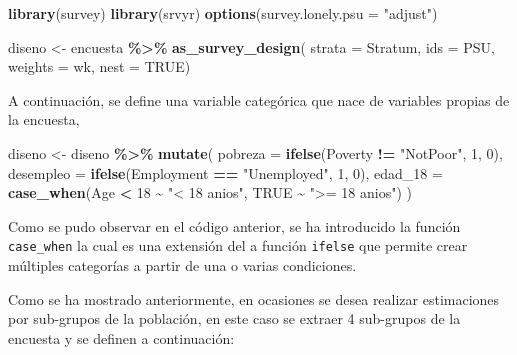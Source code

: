 \documentclass[
  12pt,
]{book}
\newenvironment{Shaded}{\begin{snugshade}}{\end{snugshade}}
\newcommand{\AttributeTok}[1]{\textcolor[rgb]{0.13,0.29,0.53}{#1}}
\newcommand{\ConstantTok}[1]{\textcolor[rgb]{0.56,0.35,0.01}{#1}}
\newcommand{\DecValTok}[1]{\textcolor[rgb]{0.00,0.00,0.81}{#1}}
\newcommand{\FunctionTok}[1]{\textcolor[rgb]{0.13,0.29,0.53}{\textbf{#1}}}
\newcommand{\NormalTok}[1]{#1}
\newcommand{\OtherTok}[1]{\textcolor[rgb]{0.56,0.35,0.01}{#1}}
\newcommand{\SpecialCharTok}[1]{\textcolor[rgb]{0.81,0.36,0.00}{\textbf{#1}}}
\newcommand{\StringTok}[1]{\textcolor[rgb]{0.31,0.60,0.02}{#1}}
\begin{document}
\begin{Shaded}
\begin{Highlighting}[]
\FunctionTok{library}\NormalTok{(survey)}
\FunctionTok{library}\NormalTok{(srvyr)}
\FunctionTok{options}\NormalTok{(}\AttributeTok{survey.lonely.psu =} \StringTok{"adjust"}\NormalTok{)}

\NormalTok{diseno }\OtherTok{\textless{}{-}}\NormalTok{ encuesta }\SpecialCharTok{\%\textgreater{}\%} 
          \FunctionTok{as\_survey\_design}\NormalTok{(}
                           \AttributeTok{strata =}\NormalTok{ Stratum,  }
                           \AttributeTok{ids =}\NormalTok{ PSU,         }
                           \AttributeTok{weights =}\NormalTok{ wk,      }
                           \AttributeTok{nest =} \ConstantTok{TRUE}\NormalTok{)}
\end{Highlighting}
\end{Shaded}

A continuación, se define una variable categórica que nace de variables propias de la encuesta,

\begin{Shaded}
\begin{Highlighting}[]
\NormalTok{diseno }\OtherTok{\textless{}{-}}\NormalTok{ diseno }\SpecialCharTok{\%\textgreater{}\%} \FunctionTok{mutate}\NormalTok{(}
                     \AttributeTok{pobreza =} \FunctionTok{ifelse}\NormalTok{(Poverty }\SpecialCharTok{!=} \StringTok{"NotPoor"}\NormalTok{, }\DecValTok{1}\NormalTok{, }\DecValTok{0}\NormalTok{),}
                     \AttributeTok{desempleo =} \FunctionTok{ifelse}\NormalTok{(Employment }\SpecialCharTok{==} \StringTok{"Unemployed"}\NormalTok{, }\DecValTok{1}\NormalTok{, }\DecValTok{0}\NormalTok{),}
                     \AttributeTok{edad\_18 =} \FunctionTok{case\_when}\NormalTok{(Age }\SpecialCharTok{\textless{}} \DecValTok{18} \SpecialCharTok{\textasciitilde{}} \StringTok{"\textless{} 18 anios"}\NormalTok{, }\ConstantTok{TRUE} \SpecialCharTok{\textasciitilde{}} \StringTok{"\textgreater{}= 18 anios"}\NormalTok{)}
\NormalTok{)}
\end{Highlighting}
\end{Shaded}

Como se pudo observar en el código anterior, se ha introducido la función \texttt{case\_when} la cual es una extensión del a función \texttt{ifelse} que permite crear múltiples categorías a partir de una o varias condiciones.

Como se ha mostrado anteriormente, en ocasiones se desea realizar estimaciones por sub-grupos de la población, en este caso se extraer 4 sub-grupos de la encuesta y se definen a continuación:
\end{document}
